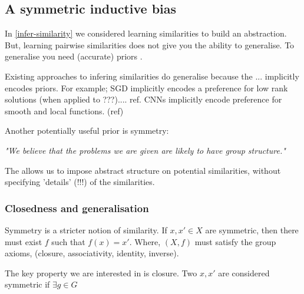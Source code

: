  \subsection{A symmetric inductive bias}


 In \ref{infer-similarity} we considered learning similarities
 to build an abstraction. But, learning pairwise similarities does not give
 you the ability to generalise. To generalise you need (accurate) priors \cite{Wolpert1996}.

Existing approaches to infering similarities do generalise because the ... implicitly encodes priors. For example;
SGD implicitly encodes a preference for low rank solutions (when applied to ???).... ref.
CNNs implicitly encode preference for smooth and local functions. (ref)

 Another potentially useful prior is symmetry:

 \begin{displayquote}
	 \textit{"We believe that the problems we are given are likely to have group structure."}
\end{displayquote}

 The allows us to impose abstract structure on potential similarities, without specifying
 'details' (!!!) of the similarities.


\subsubsection{Closedness and generalisation}

 Symmetry is a stricter notion of similarity.
 If $x, x' \in X$ are symmetric, then there must exist $f$ such that $f(x) = x'$.
 Where, $(X, f)$ must satisfy the group axioms, (closure, associativity, identity, inverse).

 The key property we are interested in is closure.
 Two $x, x'$ are considered symmetric if $\exists g\in G$


